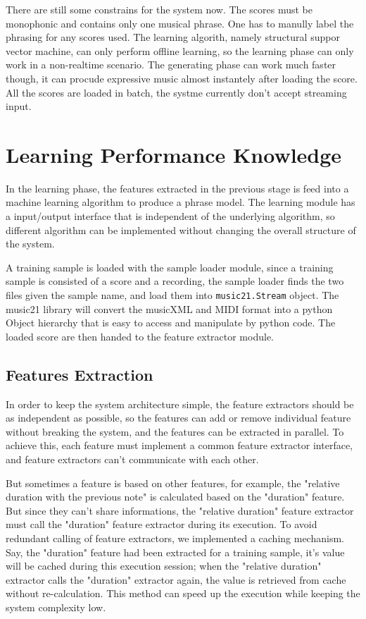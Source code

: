 There are still some constrains for the system now. The scores must be monophonic and contains only one musical phrase. One has to manully label the phrasing for any scores used. The learning algorith, namely structural suppor vector machine, can only perform offline learning, so the learning phase can only work in a non-realtime scenario. The generating phase can work much faster though, it can procude expressive music almost instantely after loading the score. All the scores are loaded in batch, the systme currently don't accept streaming input.


   \section{Learning Performance Knowledge}
   In the learning phase, the features extracted in the previous stage is feed into a machine learning algorithm to produce a phrase model. The learning module has a input/output interface that is independent of the underlying algorithm, so different algorithm can be implemented without changing the overall structure of the system.

   A training sample is loaded with the sample loader module, since a training sample is consisted of a score and a recording, the sample loader finds the two files given the sample name, and load them into \texttt{music21.Stream} object. The music21 library will convert the musicXML and MIDI format into a python Object hierarchy that is easy to access and manipulate by python code. The loaded score are then handed to the feature extractor module.

   \subsection{Features Extraction}
   In  order to keep the system architecture simple, the feature extractors should be as independent as possible, so the features can add or remove individual feature without breaking the system, and the features can be extracted in parallel. To achieve this, each feature must implement a common feature extractor interface, and feature extractors can't communicate with each other. 

   But sometimes a feature is based on other features, for example, the "relative duration with the previous note" is calculated based on the "duration" feature. But since they can't share informations, the "relative duration" feature extractor must call the "duration" feature extractor during its execution. To avoid redundant calling of feature extractors, we implemented a caching mechanism. Say, the "duration" feature had been extracted for a training sample, it's value will be cached during this execution session; when the "relative duration" extractor calls the "duration" extractor again, the value is retrieved from cache without re-calculation.  This method can speed up the execution while keeping the system complexity low.

